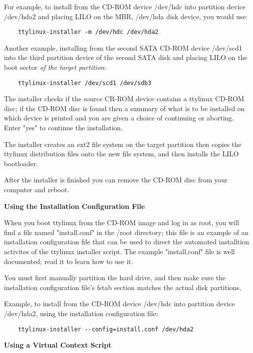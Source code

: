 \documentclass[10pt]{article}
\begin{document}
For example, to install from the CD-ROM device /dev/hdc into partition device
/dev/hda2 and placing LILO on the MBR, /dev/hda disk device, you would use:

\begin{lstlisting}
	ttylinux-installer -m /dev/hdc /dev/hda2
\end{lstlisting}

Another example, installing from the second SATA CD-ROM device /dev/scd1 into
the third partition device of the second SATA disk and placing LILO on the boot
sector {\it of the target partition}:

\begin{lstlisting}
	ttylinux-installer /dev/scd1 /dev/sdb3
\end{lstlisting}

The installer checks if the source CR-ROM device contains a ttylinux CD-ROM
disc; if the CD-ROM disc is found then a summary of what is to be installed on
which device is printed and you are given a choice of continuing or aborting.
Enter "yes" to continue the installation.

The installer creates an ext2 file system on the target partition then copies
the ttylinux distribution files onto the new file system, and then installs the
LILO bootloader.

After the installer is finished you can remove the CD-ROM disc from your
computer and reboot.

{\bf Using the Installation Configuration File}

When you boot ttylinux from the CD-ROM image and log in as root, you will find
a file named "install.conf" in the /root directory; this file is an example of
an installation configuration file that can be used to direct the automated
installtion activites of the ttylinux installer script. The example
"install.conf" file is well documented; read it to learn how to use it.

You must first manually partition the hard drive, and then make sure the
installation configuration file's fstab section matches the actual disk
partitions.

Example, to install from the CD-ROM device /dev/hdc into partition device
/dev/hda2, using the installation configuration file:

\begin{lstlisting}
	ttylinux-installer --config=install.conf /dev/hda2
\end{lstlisting}

{\bf Using a Virtual Context Script}
\end{document}
